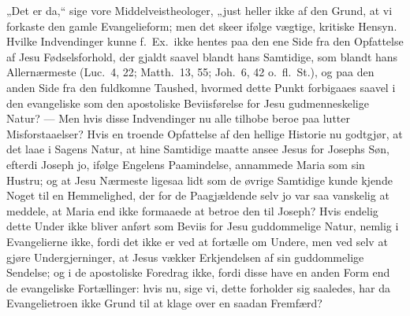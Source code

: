 \documentclass[12pt,a4paper]{book}
\begin{document}
„Det er da,“ sige vore Middelveistheologer, „just heller ikke af den Grund,
at vi forkaste den gamle Evangelieform; men det skeer ifølge vægtige,
kritiske Hensyn. Hvilke Indvendinger kunne f.\ Ex.\ ikke hentes paa den ene
Side fra den Opfattelse af Jesu Fødselsforhold, der gjaldt saavel blandt hans
Samtidige, som blandt hans Allernærmeste (Luc.\ 4, 22; Matth.\ 13, 55;
Joh.\ 6, 42 o.\ fl.\ St.), og paa den anden Side fra den fuldkomne Taushed,
hvormed
dette Punkt forbigaaes saavel i den evangeliske som den apostoliske
Beviisførelse for Jesu gudmenneskelige Natur? ---
Men hvis disse Indvendinger nu alle tilhobe beroe paa lutter Misforstaaelser?
Hvis en troende Opfattelse af den hellige Historie nu godtgjør, at det laae i
Sagens Natur, at hine Samtidige maatte ansee Jesus for Josephs Søn, efterdi
Joseph jo, ifølge Engelens Paamindelse, annammede Maria som sin Hustru; og at
Jesu Nærmeste ligesaa lidt som de øvrige Samtidige kunde kjende Noget til en
Hemmelighed, der for de Paagjældende selv jo var saa vanskelig at meddele, at
Maria end ikke formaaede at betroe den til Joseph? Hvis endelig dette Under
ikke bliver anført som Beviis for Jesu guddommelige Natur, nemlig i
Evangelierne
ikke, fordi det ikke er ved at fortælle om Undere, men ved selv at gjøre
Undergjerninger, at Jesus vækker Erkjendelsen af sin guddommelige Sendelse;
og i de apostoliske Foredrag ikke, fordi disse have en anden Form end de
evangeliske Fortællinger: hvis nu, sige vi, dette forholder sig saaledes, har
da Evangelietroen ikke Grund til at klage over en saadan Fremfærd?
\end{document}
